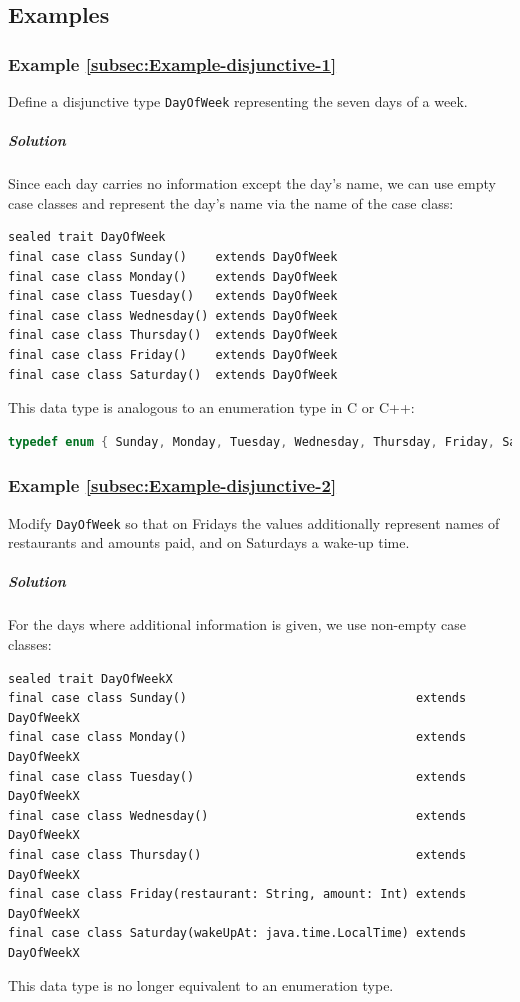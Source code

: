 \subsection{Examples}

\subsubsection{Example \label{subsec:Example-disjunctive-1}\ref{subsec:Example-disjunctive-1}}

Define a disjunctive type \lstinline!DayOfWeek! representing the
seven days of a week.

\subparagraph{Solution}

Since each day carries no information except the day\textsf{'}s name, we can
use empty case classes and represent the day\textsf{'}s name via the name of
the case class:
\begin{lstlisting}
sealed trait DayOfWeek
final case class Sunday()    extends DayOfWeek
final case class Monday()    extends DayOfWeek
final case class Tuesday()   extends DayOfWeek
final case class Wednesday() extends DayOfWeek
final case class Thursday()  extends DayOfWeek
final case class Friday()    extends DayOfWeek
final case class Saturday()  extends DayOfWeek
\end{lstlisting}
This data type is analogous to an enumeration type
in C or C++:
\begin{lstlisting}[language={C++}]
typedef enum { Sunday, Monday, Tuesday, Wednesday, Thursday, Friday, Saturday } DayOfWeek;
\end{lstlisting}


\subsubsection{Example \label{subsec:Example-disjunctive-2}\ref{subsec:Example-disjunctive-2}}

Modify \lstinline!DayOfWeek! so that on Fridays the values additionally
represent names of restaurants and amounts paid, and on Saturdays
a wake-up time.

\subparagraph{Solution}

For the days where additional information is given, we use non-empty
case classes:
\begin{lstlisting}
sealed trait DayOfWeekX
final case class Sunday()                                extends DayOfWeekX
final case class Monday()                                extends DayOfWeekX
final case class Tuesday()                               extends DayOfWeekX
final case class Wednesday()                             extends DayOfWeekX
final case class Thursday()                              extends DayOfWeekX
final case class Friday(restaurant: String, amount: Int) extends DayOfWeekX
final case class Saturday(wakeUpAt: java.time.LocalTime) extends DayOfWeekX
\end{lstlisting}
This data type is no longer equivalent to an enumeration type.

